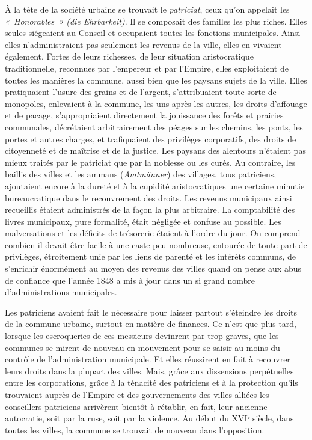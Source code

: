 \documentclass[french,twoside]{book} %
\begin{document}
À la tête de la société urbaine se trouvait le \emph{patriciat}, ceux qu’on appelait les \emph{« Honorables » (die Ehrbarkeit)}. Il se composait des familles les plus riches. Elles seules siégeaient au Conseil et occupaient toutes les fonctions municipales. Ainsi elles n’administraient pas seulement les revenus de la ville, elles en vivaient également. Fortes de leurs richesses, de leur situation aristocratique traditionnelle, reconnues par l’empereur et par l’Empire, elles exploitaient de toutes les manières la commune, aussi bien que les paysans sujets de la ville. Elles pratiquaient l’usure des grains et de l’argent, s’attribuaient toute sorte de monopoles, enlevaient à la commune, les uns après les autres, les droits d’affouage et de pacage, s’appropriaient directement la jouissance des forêts et prairies communales, décrétaient arbitrairement des péages sur les chemins, les ponts, les portes et autres charges, et trafiquaient des privilèges corporatifs, des droits de citoyenneté et de maîtrise et de la justice. Les paysans des alentours n’étaient pas mieux traités par le patriciat que par la noblesse ou les curés. Au contraire, les baillis des villes et les ammans (\emph{Amtmänner}) des villages, tous patriciens, ajoutaient encore à la dureté et à la cupidité aristocratiques une certaine minutie bureaucratique dans le recouvrement des droits. Les revenus municipaux ainsi recueillis étaient administrés de la façon la plus arbitraire. La comptabilité des livres municipaux, pure formalité, était négligée et confuse au possible. Les malversations et les déficits de trésorerie étaient à l’ordre du jour. On comprend combien il devait être facile à une caste peu nombreuse, entourée de toute part de privilèges, étroitement unie par les liens de parenté et les intérêts communs, de s’enrichir énormément au moyen des revenus des villes quand on pense aux abus de confiance que l’année 1848 a mis à jour dans un si grand nombre d’administrations municipales.\par
Les patriciens avaient fait le nécessaire pour laisser partout s’éteindre les droits de la commune urbaine, surtout en matière de finances. Ce n’est que plus tard, lorsque les escroqueries de ces messieurs devinrent par trop graves, que les communes se mirent de nouveau en mouvement pour se saisir au moins du contrôle de l’administration municipale. Et elles réussirent en fait à recouvrer leurs droits dans la plupart des villes. Mais, grâce aux dissensions perpétuelles entre les corporations, grâce à la ténacité des patriciens et à la protection qu’ils trouvaient auprès de l’Empire et des gouvernements des villes alliées les conseillers patriciens arrivèrent bientôt à rétablir, en fait, leur ancienne autocratie, soit par la ruse, soit par la violence. Au début du XVIᵉ siècle, dans toutes les villes, la commune se trouvait de nouveau dans l’opposition.\par
\end{document}
